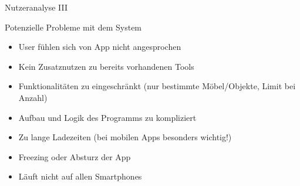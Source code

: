 \documentclass[presentation,bigger,aspectratio=169]{beamer}
\begin{document}
\begin{frame}[label={sec:org306a82e}]{Nutzeranalyse III}
\begin{block}{Potenzielle Probleme mit dem System}
\begin{itemize}
\item User fühlen sich von App nicht angesprochen
\item Kein Zusatznutzen zu bereits vorhandenen Tools
\item Funktionalitäten zu eingeschränkt (nur bestimmte Möbel/Objekte,
Limit bei Anzahl)
\item Aufbau und Logik des Programms zu kompliziert
\item Zu lange Ladezeiten (bei mobilen Apps besonders wichtig!)
\item Freezing oder Absturz der App
\item Läuft nicht auf allen Smartphones
\end{itemize}
\end{block}
\end{frame}
\end{document}
